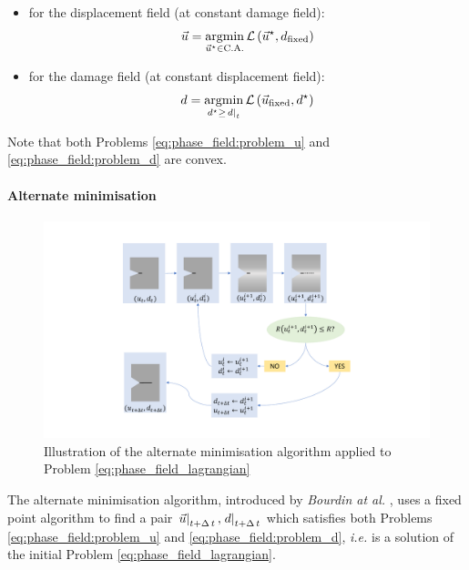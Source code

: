 \begin{itemize}
    \item for the displacement field (at constant damage field):
    \begin{equation}
        \label{eq:phase_field:problem_u}
        \vec{u} = \underset{\vec{u}^{\star}\in\text{C.A.}}{\mathrm{argmin}{}}\, \mathcal{L}\left(\vec{u}^{\star},d_\mathrm{fixed}\right)
    \end{equation}
    \item for the damage field (at constant displacement field):
    \begin{equation}
        \label{eq:phase_field:problem_d}
        d = \underset{d^{\star}\geq\left.d\right|_{t}}{\mathrm{argmin}{}}\, \mathcal{L}\left(\vec{u}_\mathrm{fixed},d^{\star}\right)
    \end{equation}
\end{itemize}

Note that both Problems \eqref{eq:phase_field:problem_u} and
\eqref{eq:phase_field:problem_d} are convex.

\paragraph{Alternate minimisation}

\begin{figure}[H]
  \centering
  \includegraphics[width=10.cm]{../chapter_001_literature_review/figures/alternate-minimisation-resolution.pdf}
  \caption{Illustration of the alternate minimisation algorithm applied to Problem \eqref{eq:phase_field_lagrangian}}
  \label{fig:hho:phase_field:alternate_minimisation}
\end{figure}


The alternate minimisation algorithm, introduced by \textit{Bourdin at al.}
\cite{bourdin_numerical_2000}, uses a fixed point algorithm to find a pair
\(\left.\vec{u}\right|_{t+\Delta\,t},\left.d\right|_{t+\Delta\,t}\) which satisfies both Problems
\eqref{eq:phase_field:problem_u} and \eqref{eq:phase_field:problem_d}, \textit{i.e.} is a
solution of the initial Problem \eqref{eq:phase_field_lagrangian}.

